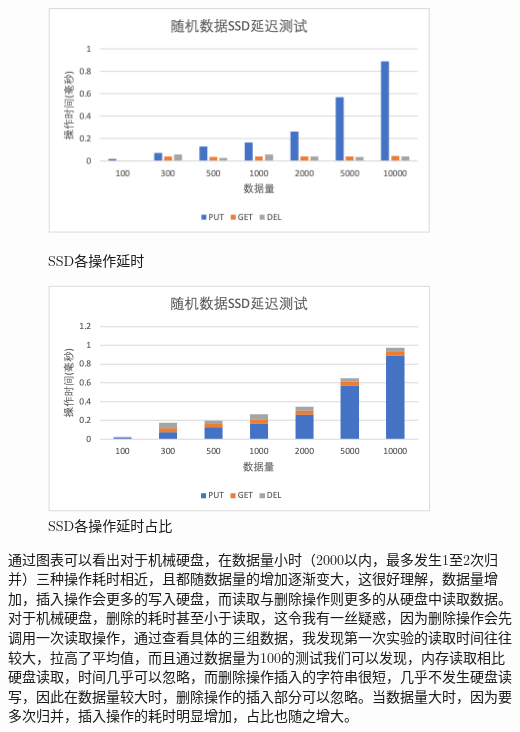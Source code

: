 \documentclass[fontset=windows]{article}
\begin{document}
\begin{enumerate}
\begin{figure}[H]
\end{figure}
\begin{figure}[H]
   \begin{minipage}[t]{0.5\linewidth}   
     \centering   
     \includegraphics[width=0.9\textwidth]{img/random_SSD_latency_three.png}   
     \caption{SSD各操作延时}   
     \label{fig:r_S_l_t}
   \end{minipage}
   \begin{minipage}[t]{0.5\linewidth} %
     \centering
     \includegraphics[width=0.9\textwidth]{img/random_SSD_latency_one.png}
     \caption{SSD各操作延时占比}
     \label{fig:r_S_l_o}
    \end{minipage} 
\end{figure}

通过图表可以看出对于机械硬盘，在数据量小时（2000以内，最多发生1至2次归并）三种操作耗时相近，且都随数据量的增加逐渐变大，这很好理解，数据量增加，插入操作会更多的写入硬盘，而读取与删除操作则更多的从硬盘中读取数据。对于机械硬盘，删除的耗时甚至小于读取，这令我有一丝疑惑，因为删除操作会先调用一次读取操作，通过查看具体的三组数据，我发现第一次实验的读取时间往往较大，拉高了平均值，而且通过数据量为100的测试我们可以发现，内存读取相比硬盘读取，时间几乎可以忽略，而删除操作插入的字符串很短，几乎不发生硬盘读写，因此在数据量较大时，删除操作的插入部分可以忽略。当数据量大时，因为要多次归并，插入操作的耗时明显增加，占比也随之增大。


\end{enumerate}
\end{document}
